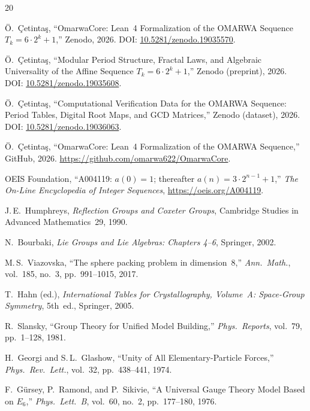 \documentclass[11pt, a4paper]{article}
\theoremstyle{plain}
\theoremstyle{definition}
\theoremstyle{remark}
\begin{document}
\begin{thebibliography}{20}

\"O.~\c{C}etinta\c{s},
``OmarwaCore: Lean~4 Formalization of the OMARWA Sequence
$T_k = 6 \cdot 2^k + 1$,''
Zenodo, 2026.
DOI: \href{https://doi.org/10.5281/zenodo.19035570}{10.5281/zenodo.19035570}.

\"O.~\c{C}etinta\c{s},
``Modular Period Structure, Fractal Laws, and Algebraic Universality
of the Affine Sequence $T_k = 6 \cdot 2^k + 1$,''
Zenodo (preprint), 2026.
DOI: \href{https://doi.org/10.5281/zenodo.19035608}{10.5281/zenodo.19035608}.

\"O.~\c{C}etinta\c{s},
``Computational Verification Data for the OMARWA Sequence:
Period Tables, Digital Root Maps, and GCD Matrices,''
Zenodo (dataset), 2026.
DOI: \href{https://doi.org/10.5281/zenodo.19036063}{10.5281/zenodo.19036063}.

\"O.~\c{C}etinta\c{s},
``OmarwaCore: Lean~4 Formalization of the OMARWA Sequence,''
GitHub, 2026.
\url{https://github.com/omarwa622/OmarwaCore}.

OEIS Foundation,
``A004119: $a(0) = 1$; thereafter $a(n) = 3 \cdot 2^{n-1} + 1$,''
\textit{The On-Line Encyclopedia of Integer Sequences},
\url{https://oeis.org/A004119}.

J.\,E.~Humphreys,
\textit{Reflection Groups and Coxeter Groups},
Cambridge Studies in Advanced Mathematics~29, 1990.

N.~Bourbaki,
\textit{Lie Groups and Lie Algebras: Chapters 4--6},
Springer, 2002.

M.\,S.~Viazovska,
``The sphere packing problem in dimension~8,''
\textit{Ann.\ Math.}, vol.~185, no.~3, pp.~991--1015, 2017.

T.~Hahn (ed.),
\textit{International Tables for Crystallography, Volume~A:
Space-Group Symmetry}, 5th~ed., Springer, 2005.

R.~Slansky,
``Group Theory for Unified Model Building,''
\textit{Phys.\ Reports}, vol.~79, pp.~1--128, 1981.

H.~Georgi and S.\,L.~Glashow,
``Unity of All Elementary-Particle Forces,''
\textit{Phys.\ Rev.\ Lett.}, vol.~32, pp.~438--441, 1974.

F.~G\"ursey, P.~Ramond, and P.~Sikivie,
``A Universal Gauge Theory Model Based on $E_6$,''
\textit{Phys.\ Lett.\ B}, vol.~60, no.~2, pp.~177--180, 1976.


\end{thebibliography}
\end{document}
